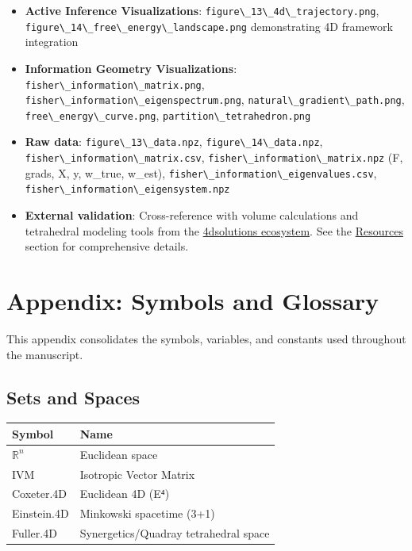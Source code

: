 \documentclass[
  10pt,
]{article}
\newcommand{\passthrough}[1]{#1}
\providecommand{\tightlist}{%
  \setlength{\itemsep}{0pt}\setlength{\parskip}{0pt}}
\begin{document}
\begin{itemize}
\tightlist
\item
  \textbf{Active Inference Visualizations}:
  \passthrough{\lstinline!figure\_13\_4d\_trajectory.png!},
  \passthrough{\lstinline!figure\_14\_free\_energy\_landscape.png!}
  demonstrating 4D framework integration
\item
  \textbf{Information Geometry Visualizations}:
  \passthrough{\lstinline!fisher\_information\_matrix.png!},
  \passthrough{\lstinline!fisher\_information\_eigenspectrum.png!},
  \passthrough{\lstinline!natural\_gradient\_path.png!},
  \passthrough{\lstinline!free\_energy\_curve.png!},
  \passthrough{\lstinline!partition\_tetrahedron.png!}
\item
  \textbf{Raw data}: \passthrough{\lstinline!figure\_13\_data.npz!},
  \passthrough{\lstinline!figure\_14\_data.npz!},
  \passthrough{\lstinline!fisher\_information\_matrix.csv!},
  \passthrough{\lstinline!fisher\_information\_matrix.npz!} (F, grads,
  X, y, w\_true, w\_est),
  \passthrough{\lstinline!fisher\_information\_eigenvalues.csv!},
  \passthrough{\lstinline!fisher\_information\_eigensystem.npz!}
\item
  \textbf{External validation}: Cross-reference with volume calculations
  and tetrahedral modeling tools from the
  \href{https://github.com/4dsolutions}{4dsolutions ecosystem}. See the
  \href{07_resources.md}{Resources} section for comprehensive details.
\end{itemize}

\newpage

\hypertarget{appendix-symbols-and-glossary}{%
\section{Appendix: Symbols and
Glossary}\label{appendix-symbols-and-glossary}}

This appendix consolidates the symbols, variables, and constants used
throughout the manuscript.

\hypertarget{sets-and-spaces}{%
\subsection{Sets and Spaces}\label{sets-and-spaces}}

\begin{longtable}[]{@{}ll@{}}
\toprule
Symbol & Name\tabularnewline
\midrule
\endhead
\(\mathbb{R}^n\) & Euclidean space\tabularnewline
IVM & Isotropic Vector Matrix\tabularnewline
Coxeter.4D & Euclidean 4D (E⁴)\tabularnewline
Einstein.4D & Minkowski spacetime (3+1)\tabularnewline
Fuller.4D & Synergetics/Quadray tetrahedral space\tabularnewline
\bottomrule
\end{longtable}
\end{document}
